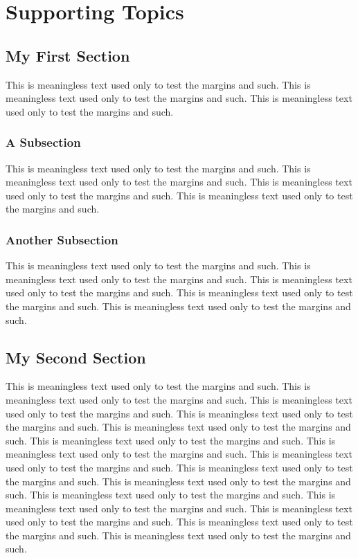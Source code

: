
\chapter{Supporting Topics}

\section{My First Section}

This is meaningless text used only to test the margins and such.
This is meaningless text used only to test the margins and such.
This is meaningless text used only to test the margins and such.
\subsection{A Subsection}
This is meaningless text used only to test the margins and such.
This is meaningless text used only to test the margins and such.
This is meaningless text used only to test the margins and such.
This is meaningless text used only to test the margins and such.
\subsection{Another Subsection}
This is meaningless text used only to test the margins and such.
This is meaningless text used only to test the margins and such.
This is meaningless text used only to test the margins and such.
This is meaningless text used only to test the margins and such.
This is meaningless text used only to test the margins and such.

\section{My Second Section}

This is meaningless text used only to test the margins and such.
This is meaningless text used only to test the margins and such.
This is meaningless text used only to test the margins and such.
This is meaningless text used only to test the margins and such.
This is meaningless text used only to test the margins and such.
This is meaningless text used only to test the margins and such.
This is meaningless text used only to test the margins and such.
This is meaningless text used only to test the margins and such.
This is meaningless text used only to test the margins and such.
This is meaningless text used only to test the margins and such.
This is meaningless text used only to test the margins and such.
This is meaningless text used only to test the margins and such.
This is meaningless text used only to test the margins and such.
This is meaningless text used only to test the margins and such.
This is meaningless text used only to test the margins and such.

